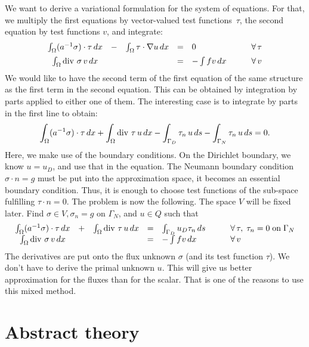We want to derive a variational formulation for the system of equations.
For that, we multiply the first equations by vector-valued test functions~$\tau$, the second equation by test functions $v$, and integrate:
$$
\begin{array}{ccccll}
\int_\Omega (a^{-1} \sigma) \cdot \tau \, dx & - & \int_\Omega \tau \cdot \nabla u \, dx & = & 0 \qquad & \forall \, \tau \\[0.5em]
\int_\Omega \operatorname{div} \, \sigma \, v \, dx & & & = & - \int f v \, dx \qquad & \forall \, v
\end{array}
$$
We would like to have the second term of the first equation of the same
structure as the first term in the second equation. This can be obtained
by integration by parts applied to either one of them. The interesting
case is to integrate by parts in the first line to obtain:
$$
\int_\Omega (a^{-1} \sigma) \cdot \tau \, dx + \int_\Omega \operatorname{div} \, \tau \, u \, dx
-\int_{\Gamma_D} \tau_n \, u \, ds - \int_{\Gamma_N} \tau_n \, u \, ds = 0.
$$
Here, we make use of the boundary conditions. On the Dirichlet boundary,
we know $u = u_D$, and use that in the equation. The Neumann boundary
condition $\sigma \cdot n = g$ must be put into the approximation space,
it becomes an essential boundary condition. Thus, it is enough to choose
test functions of the sub-space fulfilling $\tau \cdot n = 0$.
The problem is now the following. The space $V$ will be fixed later.
Find $\sigma \in V, \sigma_n = g$ on $\Gamma_N$, and $u \in Q$
such that
$$
\begin{array}{ccccll}
\int_\Omega (a^{-1} \sigma) \cdot \tau \, dx & + & 
\int_\Omega \operatorname{div} \, \tau  \, u \, dx & = & \int_{\Gamma_D} u_D \tau _n \, ds \qquad & \forall \, \tau, \; \tau_n = 0 \; \mbox{on} \; \Gamma_N \\
\int_\Omega \operatorname{div} \, \sigma \, v \, dx & & & = & - \int f v \, dx \qquad & \forall \, v
\end{array}
$$
The derivatives are put onto the flux unknown $\sigma$ (and its test function $\tau$).
We don't have to derive the primal unknown $u$. This will give us better
approximation for the fluxes than for the scalar. That is one of the reasons
to use this mixed method.


\section{Abstract theory}

